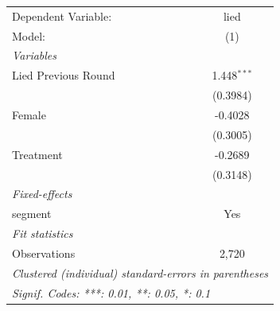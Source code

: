 
\begingroup
\centering
\begin{tabular}{lc}
   \tabularnewline \midrule \midrule
   Dependent Variable: & lied\\  
   Model:              & (1)\\  
   \midrule
   \emph{Variables}\\
   Lied Previous Round & 1.448$^{***}$\\   
                       & (0.3984)\\   
   Female              & -0.4028\\   
                       & (0.3005)\\   
   Treatment           & -0.2689\\   
                       & (0.3148)\\   
   \midrule
   \emph{Fixed-effects}\\
   segment             & Yes\\  
   \midrule
   \emph{Fit statistics}\\
   Observations        & 2,720\\  
   \midrule \midrule
   \multicolumn{2}{l}{\emph{Clustered (individual) standard-errors in parentheses}}\\
   \multicolumn{2}{l}{\emph{Signif. Codes: ***: 0.01, **: 0.05, *: 0.1}}\\
\end{tabular}
\par\endgroup


